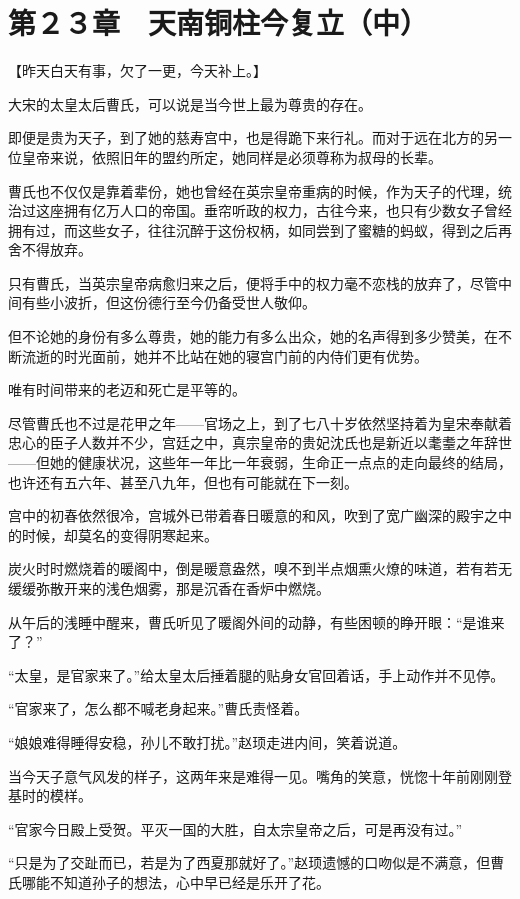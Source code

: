 \section{第２３章　天南铜柱今复立（中）}

【昨天白天有事，欠了一更，今天补上。】

大宋的太皇太后曹氏，可以说是当今世上最为尊贵的存在。

即便是贵为天子，到了她的慈寿宫中，也是得跪下来行礼。而对于远在北方的另一位皇帝来说，依照旧年的盟约所定，她同样是必须尊称为叔母的长辈。

曹氏也不仅仅是靠着辈份，她也曾经在英宗皇帝重病的时候，作为天子的代理，统治过这座拥有亿万人口的帝国。垂帘听政的权力，古往今来，也只有少数女子曾经拥有过，而这些女子，往往沉醉于这份权柄，如同尝到了蜜糖的蚂蚁，得到之后再舍不得放弃。

只有曹氏，当英宗皇帝病愈归来之后，便将手中的权力毫不恋栈的放弃了，尽管中间有些小波折，但这份德行至今仍备受世人敬仰。

但不论她的身份有多么尊贵，她的能力有多么出众，她的名声得到多少赞美，在不断流逝的时光面前，她并不比站在她的寝宫门前的内侍们更有优势。

唯有时间带来的老迈和死亡是平等的。

尽管曹氏也不过是花甲之年——官场之上，到了七八十岁依然坚持着为皇宋奉献着忠心的臣子人数并不少，宫廷之中，真宗皇帝的贵妃沈氏也是新近以耄耋之年辞世——但她的健康状况，这些年一年比一年衰弱，生命正一点点的走向最终的结局，也许还有五六年、甚至八九年，但也有可能就在下一刻。

宫中的初春依然很冷，宫城外已带着春日暖意的和风，吹到了宽广幽深的殿宇之中的时候，却莫名的变得阴寒起来。

炭火时时燃烧着的暖阁中，倒是暖意盎然，嗅不到半点烟熏火燎的味道，若有若无缓缓弥散开来的浅色烟雾，那是沉香在香炉中燃烧。

从午后的浅睡中醒来，曹氏听见了暖阁外间的动静，有些困顿的睁开眼：“是谁来了？”

“太皇，是官家来了。”给太皇太后捶着腿的贴身女官回着话，手上动作并不见停。

“官家来了，怎么都不喊老身起来。”曹氏责怪着。

“娘娘难得睡得安稳，孙儿不敢打扰。”赵顼走进内间，笑着说道。

当今天子意气风发的样子，这两年来是难得一见。嘴角的笑意，恍惚十年前刚刚登基时的模样。

“官家今日殿上受贺。平灭一国的大胜，自太宗皇帝之后，可是再没有过。”

“只是为了交趾而已，若是为了西夏那就好了。”赵顼遗憾的口吻似是不满意，但曹氏哪能不知道孙子的想法，心中早已经是乐开了花。

